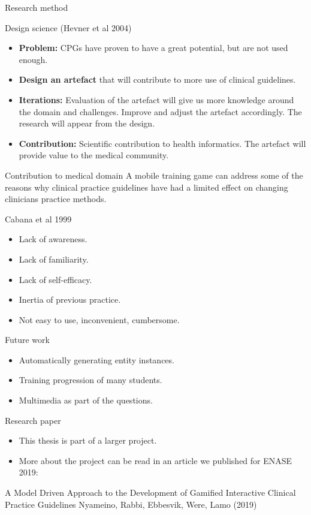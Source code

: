 \documentclass{beamer}
\begin{document}
\begin{frame}{Research method}
\begin{block}{Design science (Hevner et al 2004)}
	\begin{itemize}
		\item \textbf{Problem:} CPGs have proven to have a great potential, but are not used enough.
		\item \textbf{Design an artefact} that will contribute to more use of clinical guidelines.
		\item \textbf{Iterations:} Evaluation of the artefact will give us more knowledge around the domain and challenges. Improve and adjust the artefact accordingly. The research will appear from the design.
		\item \textbf{Contribution:} Scientific contribution to health informatics. The artefact will provide value to the medical community.
	\end{itemize}
\end{block}
\end{frame}

\begin{frame}{Contribution to medical domain}
A mobile training game can address some of the reasons why clinical practice guidelines have had a limited effect on changing clinicians practice methods.
\begin{block}{Cabana et al 1999}
	\begin{itemize}
		\item Lack of awareness.
		\item Lack of familiarity.
		\item  Lack of self-efficacy.
		\item Inertia of previous practice.
		\item Not easy to use, inconvenient, cumbersome.
	\end{itemize}
\end{block}
\end{frame}

\begin{frame}{Future work}
\begin{itemize}
	\item Automatically generating entity instances.
	\item Training progression of many students.
	\item Multimedia as part of the questions.
\end{itemize}
\end{frame}

\begin{frame}{Research paper}
\begin{itemize}
\item This thesis is part of a larger project.
\item More about the project can be read in an article we published for ENASE 2019:
\end{itemize}
 \begin{block}{}A Model Driven Approach to the Development of Gamified Interactive Clinical Practice Guidelines
\newline
Nyameino, Rabbi, Ebbesvik, Were, Lamo (2019)
\end{block}
\end{frame}
\end{document}
